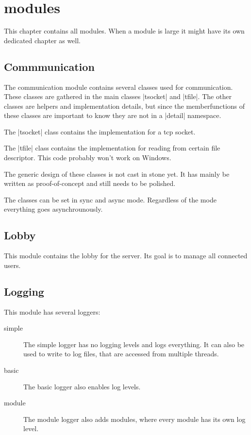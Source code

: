 \chapter{modules}
\label{chapter:modules}

This chapter contains all modules. When a module is large it might have its
own dedicated chapter as well.


\section{Commmunication}
\label{section:module:communication}

The communication module contains several classes used for communication.
These classes are gathered in the main classes \command|tsocket| and
\command|tfile|. The other classes are helpers and implementation details,
but since the memberfunctions of these classes are important to know they
are not in a \command|detail| namespace.

The \command|tsocket| class contains the implementation for a tcp socket.

The \command|tfile| class contains the implementation for reading from
certain file descriptor. This code probably won't work on Windows.

The generic design of these classes is not cast in stone yet. It has mainly
be written as proof-of-concept and still needs to be polished.

The classes can be set in sync and async mode. Regardless of the mode
everything goes asynchrounously.


\section{Lobby}
\label{section:module:lobby}

This module contains the lobby for the server. Its goal is to manage all
connected users.


\section{Logging}
\label{logging}

This module has several loggers:
\begin{description}
\item[simple]
	The simple logger has no logging levels and logs everything. It can also
	be used to write to log files, that are accessed from multiple threads.

\item[basic]
	The basic logger also enables log levels.

\item[module]
	The module logger also adds modules, where every module has its own
	log level.

\end{description}
